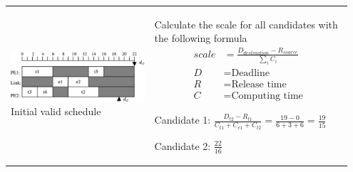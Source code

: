 \begin{longtable}{p{0.4\linewidth}p{0.55\linewidth}}
			\includegraphics[scale=0.26]{./pictures/voltage_scheduling_1.png} \newline
				Initial valid schedule
			& 		
				\vspace{-90pt}	
				\begin{compactenum}
					\setcounter{enumi}{1}
					\item Calculate the scale for all candidates with the following formula
					\begin{equation*}
						\begin{aligned}
							scale&=\frac{D_{destination}-R_{source}}{\sum_{i}C_i} \\
							D &= \text{Deadline} \\
							R &= \text{Release time} \\
							C &= \text{Computing time}
						\end{aligned}
					\end{equation*}
					\begin{compactitem}
						\item Candidate 1: $\frac{D_{t2}-R_{t1}}{C_{t1}+C_{e1}+C_{t2}}=\frac{19-0}{6+3+6}=\frac{19}{15}$
						\item Candidate 2: $\frac{22}{16}$
					\end{compactitem}
				\end{compactenum}\\
				

\end{longtable}
